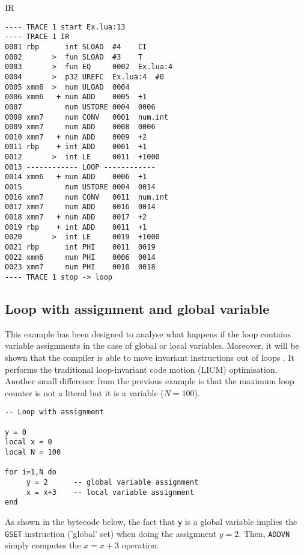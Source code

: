 \noindent
IR

\begin{multicols}{2}
\begin{lstlisting}[style=DumpStyle]
---- TRACE 1 start Ex.lua:13
---- TRACE 1 IR
0001 rbp      int SLOAD  #4    CI
0002       >  fun SLOAD  #3    T
0003       >  fun EQ     0002  Ex.lua:4
0004       >  p32 UREFC  Ex.lua:4  #0  
0005 xmm6  >  num ULOAD  0004
0006 xmm6   + num ADD    0005  +1  
0007          num USTORE 0004  0006
0008 xmm7     num CONV   0001  num.int
0009 xmm7     num ADD    0008  0006
0010 xmm7   + num ADD    0009  +2  
0011 rbp    + int ADD    0001  +1  
0012       >  int LE     0011  +1000
0013 ------------ LOOP ------------
0014 xmm6   + num ADD    0006  +1  
0015          num USTORE 0004  0014
0016 xmm7     num CONV   0011  num.int
0017 xmm7     num ADD    0016  0014
0018 xmm7   + num ADD    0017  +2  
0019 rbp    + int ADD    0011  +1  
0020       >  int LE     0019  +1000
0021 rbp      int PHI    0011  0019
0022 xmm6     num PHI    0006  0014
0023 xmm7     num PHI    0010  0018
---- TRACE 1 stop -> loop
\end{lstlisting}
\end{multicols}


\iffalse

\subsection{Loop with assignment and global variable}
This example has been designed to analyse what happens if the loop contains variable assignments in the case of global or local variables. Moreover, it will be shown that the compiler is able to move invariant instructions out of loops \cite{lj-mail-understand-ir}. It performs the traditional loop-invariant code motion (LICM) optimisation. Another small difference from the previous example is that the maximum loop counter is not a literal but it is a variable ($N=100$). 
\begin{mdframed}[style=LuaStyleFrame]
\begin{lstlisting}[style=LuaStyle]
-- Loop with assignment

y = 0
local x = 0
local N = 100

for i=1,N do
	 y = 2      -- global variable assignment
	 x = x+3    -- local variable assignment
end
\end{lstlisting}
\end{mdframed}

\noindent
As shown in the bytecode below, the fact that \texttt{y} is a global variable implies the \texttt{GSET} instruction ('global' set) when doing the assignment $y=2$. Then, \texttt{ADDVN} simply computes the $x=x+3$ operation. 

